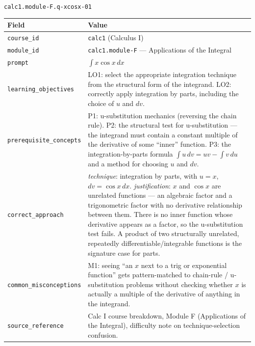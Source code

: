 \documentclass[11pt]{article}
\begin{document}
\begin{questionbox}{\texttt{calc1.module-F.q-xcosx-01}}
\small
\begin{tabularx}{\linewidth}{P{4.0cm} X}
\toprule
\textbf{Field} & \textbf{Value} \\
\midrule
\texttt{course\_\allowbreak id} & \texttt{calc1} (Calculus I) \\
\texttt{module\_\allowbreak id} & \texttt{calc1.module-F} --- Applications of the Integral \\
\texttt{prompt} & $\displaystyle\int x \cos x \, dx$ \\
\texttt{learning\_\allowbreak objectives} &
  LO1: select the appropriate integration technique from the structural
  form of the integrand. \newline
  LO2: correctly apply integration by parts, including the choice of $u$
  and $dv$. \\
\texttt{prerequisite\_\allowbreak concepts} &
  P1: u-substitution mechanics (reversing the chain rule). \newline
  P2: the structural test for u-substitution --- the integrand must contain
  a constant multiple of the derivative of some ``inner'' function.
  \newline
  P3: the integration-by-parts formula $\int u\,dv = uv - \int v\,du$ and a
  method for choosing $u$ and $dv$. \\
\texttt{correct\_\allowbreak approach} &
  \textit{technique}: integration by parts, with $u = x$, $dv = \cos x\,dx$.
  \newline
  \textit{justification}: $x$ and $\cos x$ are unrelated functions --- an
  algebraic factor and a trigonometric factor with no derivative
  relationship between them. There is no inner function whose derivative
  appears as a factor, so the u-substitution test fails. A product of two
  structurally unrelated, repeatedly differentiable/integrable functions is
  the signature case for parts. \\
\texttt{common\_\allowbreak misconceptions} &
  M1: seeing ``an $x$ next to a trig or exponential function'' gets
  pattern-matched to chain-rule / u-substitution problems without checking
  whether $x$ is actually a multiple of the derivative of anything in the
  integrand. \\
\texttt{source\_\allowbreak reference} & Calc I course breakdown, Module F (Applications
  of the Integral), difficulty note on technique-selection confusion. \\
\bottomrule
\end{tabularx}
\end{questionbox}
\end{document}
